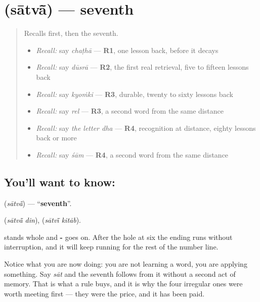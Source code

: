 \section[\texorpdfstring{\hi{सातवाँ} / \hi{सातवीं} (sātvā̃ / sātvī̃)}{सातवाँ / सातवीं (sātvā̃ / sātvī̃)}]{ (sātvā̃) — seventh}

\label{lesson:HI-C76-seventh}



\begin{quote}
Recalls first, then the seventh.

\begin{itemize}
\raggedright
  \item \emph{Recall:} say \emph{chaṭhā} — \textbf{R1}, one lesson back, before it decays
  \item \emph{Recall:} say \emph{dūsrā} — \textbf{R2}, the first real retrieval, five to fifteen lessons back
  \item \emph{Recall:} say \emph{kyoṁki} — \textbf{R3}, durable, twenty to sixty lessons back
  \item \emph{Recall:} say \emph{rel} — \textbf{R3}, a second word from the same distance
  \item \emph{Recall:} say \emph{the letter dha} — \textbf{R4}, recognition at distance, eighty lessons back or more
  \item \emph{Recall:} say \emph{śām} — \textbf{R4}, a second word from the same distance
\end{itemize}
\end{quote}

\subsection*{You'll want to know: }
\textbf{} (\emph{sātvā̃}) — \textquotedblleft{}\textbf{seventh}\textquotedblright{}.

\textbf{ } (\emph{sātvā̃ din}), \textbf{ } (\emph{sātvī̃ kitāb}).

\textbf{} stands whole and \textbf{-} goes on. After the hole at six the ending runs without interruption, and it will keep running for the rest of the number line.

Notice what you are now doing: you are not learning a word, you are applying something. Say \emph{sāt} and the seventh follows from it without a second act of memory. That is what a rule buys, and it is why the four irregular ones were worth meeting first — they were the price, and it has been paid.

